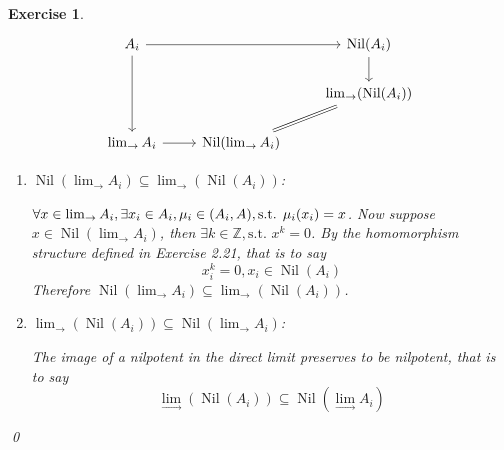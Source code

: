 \documentclass{article}
\theoremstyle{breakstyle}
\newtheorem{exercise}{Exercise}
\let\hom\relax
\DeclareMathOperator{\hom}{Hom}
\DeclareMathOperator{\nil}{Nil}
\begin{document}
\begin{exercise}
    $$
\begin{tikzcd}
A_i \arrow[rr] \arrow[dd]      &                                                                    & \mathrm{Nil}(A_i) \arrow[d]         \\
                               &                                                                    & \lim_\rightarrow(\mathrm{Nil}(A_i)) \\
\lim_\rightarrow A_i \arrow[r] & \mathrm{Nil}(\lim_\rightarrow A_i) \arrow[ru, Rightarrow, no head] &                                    
\end{tikzcd}
    $$
    \begin{enumerate}[label=({\roman*})]
        \item $\nil(\lim_{\rightarrow }A_{i})\subseteq \lim_{\rightarrow } (\nil(A_{i}))$:

            $\forall x\in \lim_{\rightarrow }A_{i},\exists x_{i}\in A_{i},\mu_{i}\in \hom(A_{i},A),\text{s.t. }\mu_{i}(x_{i})=x$.
            Now suppose $x\in \nil(\lim_{\rightarrow } A_{i})$, then $\exists k\in \mathbb{Z},\text{s.t. }x^{k}=0$.
            By the homomorphism structure defined in \emph{Exercise 2.21}, that is to say
            $$
            x_{i}^{k}=0, x_{i}\in \nil(A_{i})
            $$
            Therefore $\nil(\lim_{\rightarrow }A_{i})\subseteq \lim_{\rightarrow } (\nil(A_{i}))$.
        \item $\lim_{\rightarrow } (\nil(A_{i}))\subseteq \nil(\lim_{\rightarrow }A_{i})$:

            The image of a nilpotent in the direct limit preserves to be nilpotent, that is to say
            $$
            \lim_{\rightarrow } (\nil(A_{i}))\subseteq \nil(\lim_{\rightarrow }A_{i})
            $$
    \end{enumerate}
    \qed
\end{exercise}
\end{document}
